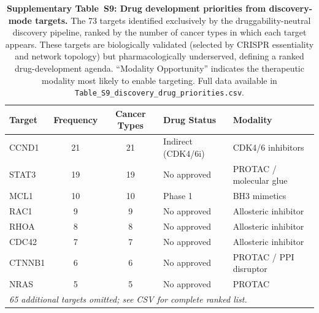 \documentclass[11pt]{article}
\begin{document}
\begin{table}[htbp]
\centering
\caption{\textbf{Supplementary Table~S9: Drug development priorities from discovery-mode targets.} The 73 targets identified exclusively by the druggability-neutral discovery pipeline, ranked by the number of cancer types in which each target appears. These targets are biologically validated (selected by CRISPR essentiality and network topology) but pharmacologically underserved, defining a ranked drug-development agenda. ``Modality Opportunity'' indicates the therapeutic modality most likely to enable targeting. Full data available in \texttt{Table\_S9\_discovery\_drug\_priorities.csv}.}
\label{tab:s9_discovery_priorities}
\scriptsize
\begin{tabular}{lcclp{3cm}}
\toprule
\textbf{Target} & \textbf{Frequency} & \textbf{Cancer Types} & \textbf{Drug Status} & \textbf{Modality} \\
\midrule
CCND1 & 21 & 21 & Indirect (CDK4/6i) & CDK4/6 inhibitors \\
STAT3 & 19 & 19 & No approved & PROTAC / molecular glue \\
MCL1 & 10 & 10 & Phase 1 & BH3 mimetics \\
RAC1 & 9 & 9 & No approved & Allosteric inhibitor \\
RHOA & 8 & 8 & No approved & Allosteric inhibitor \\
CDC42 & 7 & 7 & No approved & Allosteric inhibitor \\
CTNNB1 & 6 & 6 & No approved & PROTAC / PPI disruptor \\
NRAS & 5 & 5 & No approved & PROTAC \\
\midrule
\multicolumn{5}{l}{\textit{65 additional targets omitted; see CSV for complete ranked list.}} \\
\bottomrule
\end{tabular}
\end{table}
\end{document}
